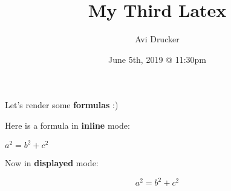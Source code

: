 \documentclass{article}
\title{My Third Latex}
\author{Avi Drucker}
\date{June 5th, 2019 @ 11:30pm}
\begin{document}
\maketitle
Let's render some \textbf{formulas} :)

Here is a formula in \textbf{inline} mode:

$a^2 = b^2 + c^2$

Now in \textbf{displayed} mode:

\[a^2 = b^2 + c^2\]
\end{document}

